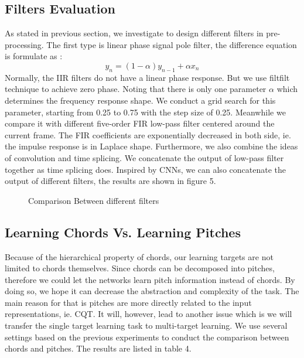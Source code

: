 \documentclass{article}
\begin{document}
\subsection{Filters Evaluation}
As stated in previous section, we investigate to design different filters in pre-processing. The first type is linear phase signal pole filter, the difference equation is formulate as :
\begin{equation}\label{IIR}
y_{n} = (1-\alpha) y_{n-1} + \alpha x_{n}
\end{equation}
Normally, the IIR filters do not have a linear phase response. But we use filtfilt technique to achieve zero phase. Noting that there is only one parameter $\alpha$ which determines the frequency response shape. We conduct a grid search for this parameter, starting from 0.25 to 0.75 with the step size of 0.25. Meanwhile we compare it with different five-order FIR low-pass filter centered around the current frame. The FIR coefficients are exponentially decreased in both side, ie. the impulse response is in Laplace shape. Furthermore, we also combine the ideas of convolution and time splicing. We concatenate the output of low-pass filter together as time splicing does. Inspired by CNNs, we can also concatenate the output of different filters, the results are shown in figure 5.

\begin{figure}
 \centerline{}
 \caption{Comparison Between different filters}
\end{figure}

\subsection{Learning Chords Vs. Learning Pitches}
Because of the hierarchical property of chords, our learning targets are not limited to chords themselves. Since chords can be decomposed into pitches, therefore we could let the networks learn pitch information instead of chords. By doing so, we hope it can decrease the abstraction and complexity of the task. The main reason for that is pitches are more directly related to the input representations, ie. CQT. It will, however, lead to another issue which is we will transfer the single target learning task to multi-target learning. We use several settings based on the previous experiments to conduct the comparison between chords and pitches. The results are listed in table 4. 
\end{document}
